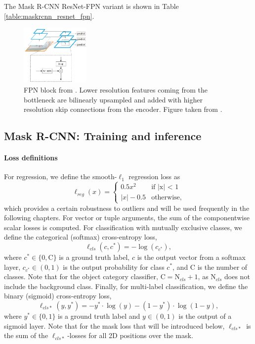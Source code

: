 The Mask R-CNN ResNet-FPN variant is shown in Table \ref{table:maskrcnn_resnet_fpn}.


\begin{figure}[t]
  \centering
  \includegraphics[width=0.3\textwidth]{figures/fpn}
\caption{
FPN block from \cite{FPN}.
Lower resolution features coming from the bottleneck are bilinearly upsampled
and added with higher resolution skip connections from the encoder.
Figure taken from \cite{FPN}.
}
\label{figure:fpn_block}
\end{figure}

\subsection{Mask R-CNN: Training and inference}
\paragraph{Loss definitions}
For regression, we define the smooth-$\ell_1$ regression loss as
\begin{equation}
\ell_{reg}(x) =
\begin{cases}
0.5x^2 &\text{if |x| < 1} \\
|x| - 0.5 &\text{otherwise,}
\end{cases}
\end{equation}
which provides a certain robustness to outliers and will be used
frequently in the following chapters. For vector or tuple arguments, the sum of the componentwise scalar
losses is computed.
For classification with mutually exclusive classes, we define the categorical (softmax) cross-entropy loss,
\begin{equation}
\ell_{cls}(c, c^*) = -\log(c_{c^*}),
\end{equation}
where $c^* \in \{0,\text{C}\}$ is a ground truth label,
$c$ is the output vector from a softmax layer,
$c_{c^*} \in (0,1)$ is the output probability for class $c^*$,
and $\text{C}$ is the number of classes.
Note that for the object category classifier, $\text{C} = \text{N}_{cls} + 1$,
as $\text{N}_{cls}$ does not include the background class.
Finally, for multi-label classification, we define the binary (sigmoid) cross-entropy loss,
\begin{equation}
\ell_{cls*}(y, y^*) = -y^* \cdot \log(y) - (1 - y^*) \cdot \log(1 - y),
\end{equation}
where $y^* \in \{0,1\}$ is a ground truth label and $y \in (0,1)$ is the output of a sigmoid layer.
Note that for the mask loss that will be introduced below, $\ell_{cls*}$ is
the sum of the $\ell_{cls*}$-losses for all 2D positions over the mask.

